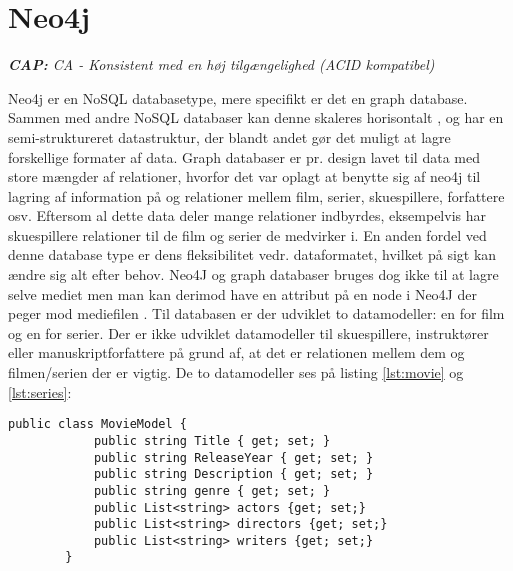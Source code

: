 \section{Neo4j}
\begin{displayquote}
    \textit{\textbf{CAP:} CA - Konsistent med en høj tilgængelighed (ACID kompatibel)}
\end{displayquote}

Neo4j er en NoSQL databasetype, mere specifikt er det en graph database. Sammen med andre NoSQL databaser kan denne skaleres horisontalt \cite{graphfacelift}, og har en semi-struktureret datastruktur, der blandt andet gør det muligt at lagre forskellige formater af data. Graph databaser er pr. design lavet til data med store mængder af relationer, hvorfor det var oplagt at benytte sig af neo4j til lagring af information på og relationer mellem film, serier, skuespillere, forfattere osv. Eftersom al dette data deler mange relationer indbyrdes, eksempelvis har skuespillere relationer til de film og serier de medvirker i. En anden fordel ved denne database type er dens fleksibilitet vedr. dataformatet, hvilket på sigt kan ændre sig alt efter behov. Neo4J og graph databaser bruges dog ikke til at lagre selve mediet men man kan derimod have en attribut på en node i Neo4J der peger mod mediefilen \cite{graphmediafiles}.
\bigbreak
Til databasen er der udviklet to datamodeller: en for film og en for serier. Der er ikke udviklet datamodeller til skuespillere, instruktører eller manuskriptforfattere på grund af, at det er relationen mellem dem og filmen/serien der er vigtig. De to datamodeller ses på listing \ref{lst:movie} og \ref{lst:series}:

\begin{tcolorbox}
    \lstset{style=sharpstyle}
    \begin{lstlisting}[language={[Sharp]C}, caption={C\# MovieModel Class}, label={lst:movie}]
        public class MovieModel {
            public string Title { get; set; }
            public string ReleaseYear { get; set; }
            public string Description { get; set; }
            public string genre { get; set; }
            public List<string> actors {get; set;}
            public List<string> directors {get; set;}
            public List<string> writers {get; set;}
        }
    \end{lstlisting}
\end{tcolorbox}

